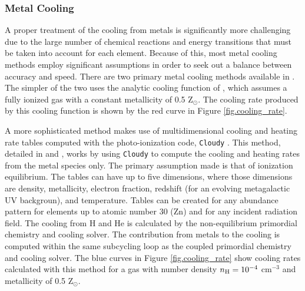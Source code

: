 \subsubsection{Metal Cooling}

A proper treatment of the cooling from metals is significantly more
challenging due to the large number of chemical reactions and energy
transitions that must be taken into account for each element.  Because
of this, most metal cooling methods employ significant assumptions in
order to seek out a balance between accuracy and speed.  There are two
primary metal cooling methods available in \enzo.  The simpler of the
two uses the analytic cooling function of \citet{SW87}, which assumes
a fully ionized gas with a constant metallicity of 0.5 Z$_{\odot}$.
The cooling rate produced by this cooling function is shown by the red 
curve in Figure \ref{fig.cooling_rate}.

A more sophisticated method makes use of multidimensional cooling and
heating rate tables computed with the photo-ionization code,
\texttt{Cloudy} \citep{1998PASP..110..761F}.  This method, detailed in
\citet{2008MNRAS.385.1443S} and \citet{2011ApJ...731....6S}, works by
using \texttt{Cloudy} to compute the cooling and heating rates from
the metal species only.  The primary assumption made is that of
ionization equilibrium.  The tables can have up to five dimensions,
where those dimensions are density, metallicity, electron fraction,
redshift (for an evolving metagalactic UV backgroun), and
temperature.  Tables can be created for any abundance pattern for
elements up to atomic number 30 (Zn) and for any incident radiation
field.  The cooling from H and He is calculated by the non-equilibrium
primordial chemistry and cooling solver.  The contribution from metals
to the cooling is computed within the same subcycling loop as the
coupled primordial chemistry and cooling solver.  The blue curves in
Figure \ref{fig.cooling_rate} show cooling rates calculated with this
method for a gas with number density $n_{\rm H} = 10^{-4}$ cm$^{-3}$ and
metallicity of 0.5 Z$_{\odot}$.

